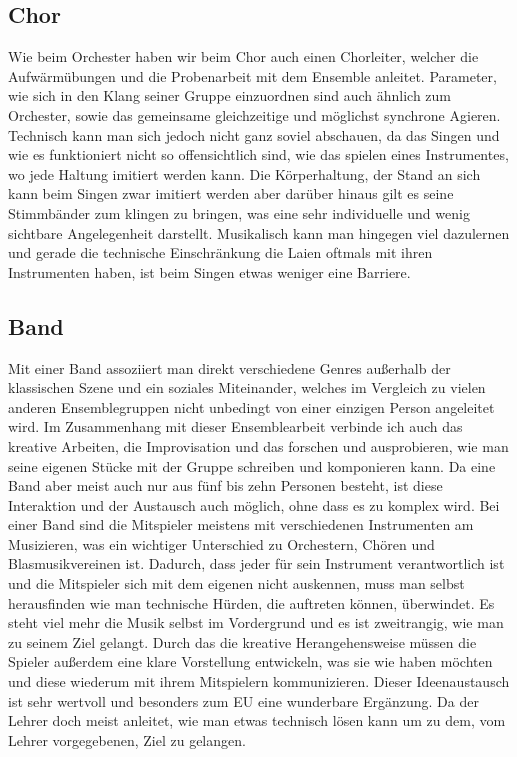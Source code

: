 \subsection{Chor}
Wie beim Orchester haben wir beim Chor auch einen Chorleiter, welcher die
Aufwärmübungen und die Probenarbeit mit dem Ensemble anleitet. Parameter, wie
sich in den Klang seiner Gruppe einzuordnen sind auch ähnlich zum Orchester,
sowie das gemeinsame gleichzeitige und möglichst synchrone Agieren. Technisch
kann man sich jedoch nicht ganz soviel abschauen, da das Singen und wie es
funktioniert nicht so offensichtlich sind, wie das spielen eines Instrumentes,
wo jede Haltung imitiert werden kann. Die Körperhaltung, der Stand an sich kann
beim Singen zwar imitiert werden aber darüber hinaus gilt es seine Stimmbänder
zum klingen zu bringen, was eine sehr individuelle und wenig sichtbare
Angelegenheit darstellt. Musikalisch kann man hingegen viel dazulernen und
gerade die technische Einschränkung die Laien oftmals mit ihren Instrumenten
haben, ist beim Singen etwas weniger eine Barriere.


\subsection{Band}
Mit einer Band assoziiert man direkt verschiedene Genres außerhalb der
klassischen Szene und ein soziales Miteinander, welches im Vergleich zu vielen
anderen Ensemblegruppen nicht unbedingt von einer einzigen Person angeleitet
wird. Im Zusammenhang mit dieser Ensemblearbeit verbinde ich auch das kreative
Arbeiten, die Improvisation und das forschen und ausprobieren, wie man seine
eigenen Stücke mit der Gruppe schreiben und komponieren kann. Da eine Band aber
meist auch nur aus fünf bis zehn Personen besteht, ist diese Interaktion und der
Austausch auch möglich, ohne dass es zu komplex wird. Bei einer Band sind die
Mitspieler meistens mit verschiedenen Instrumenten am Musizieren, was ein
wichtiger Unterschied zu Orchestern, Chören und Blasmusikvereinen ist. Dadurch,
dass jeder für sein Instrument verantwortlich ist und die Mitspieler sich mit
dem eigenen nicht auskennen, muss man selbst herausfinden wie man technische
Hürden, die auftreten können, überwindet. Es steht viel mehr die Musik selbst im
Vordergrund und es ist zweitrangig, wie man zu seinem Ziel gelangt. Durch das
die kreative Herangehensweise müssen die Spieler außerdem eine klare Vorstellung
entwickeln, was sie wie haben möchten und diese wiederum mit ihrem Mitspielern
kommunizieren. Dieser Ideenaustausch ist sehr wertvoll und besonders zum EU eine
wunderbare Ergänzung. Da der Lehrer doch meist anleitet, wie man etwas technisch
lösen kann um zu dem, vom Lehrer vorgegebenen, Ziel zu gelangen. 


